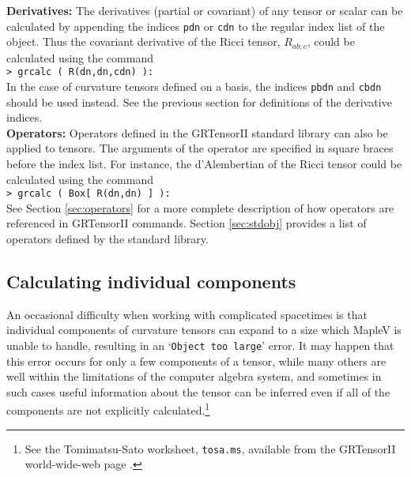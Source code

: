 \documentclass{article}
\begin{document}
\noindent\textbf{Derivatives:} The derivatives (partial or covariant) of
any tensor or scalar can be calculated by appending the indices
\texttt{pdn} or \texttt{cdn} to the regular index list of the object.
Thus the covariant derivative of the Ricci tensor, $R_{ab;c}$,
could be calculated using the command\\

\noindent\texttt{> grcalc ( R(dn,dn,cdn) ):}\\

\noindent In the case of curvature tensors defined on a basis, the indices
\texttt{pbdn} and \texttt{cbdn} should be used instead. See the previous
section for definitions of the derivative indices.\\

\noindent\textbf{Operators:} Operators defined in the GRTensorII standard
library can also be applied to tensors. The arguments of the operator
are specified in square braces before the index list. For instance, the
d'Alembertian of the Ricci tensor could be calculated using the command\\

\noindent\texttt{> grcalc ( Box[ R(dn,dn) ] ):}\\

\noindent See Section \ref{sec:operators} for a more complete description
of how operators are referenced in GRTensorII commands. Section
\ref{sec:stdobj} provides a list of operators defined by the standard library.
%
\subsection{Calculating individual components} \label{sec:grcalc1}
%
An occasional difficulty when working with complicated spacetimes is
that individual components of curvature tensors can expand to a size
which MapleV is unable to handle, resulting in an `\texttt{Object too
large}' error.  It may happen that this error occurs for only a few
components of a tensor, while many others are well within the
limitations of the computer algebra system, and sometimes in such
cases useful information about the tensor can be inferred even if all
of the components are not explicitly calculated.\footnote{See the
Tomimatsu-Sato worksheet, \texttt{tosa.ms}, available from the
GRTensorII world-wide-web page \cite{www}.}
\end{document}
